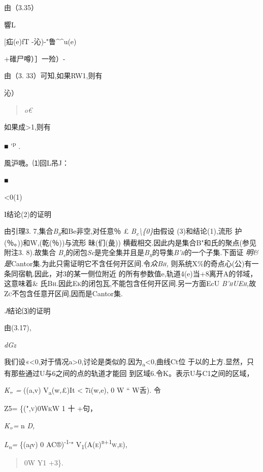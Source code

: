 \documentclass{article}
\begin{document}
由（3.35）

響L

{[}疝(e)fT -沁)-"鲁\^{}\^{}u(e)

+碓尸噂）］一殓）-

由（3. 33）可知,如果RW1,则有

沁）

\begin{quote}
\emph{o€}
\end{quote}

如果成\textgreater{}1,则有

■ '\textsuperscript{p} .

風沪嘰。⑴回L吊J：

■

\textless{}0(1)

I结论(2)的证明

由引理3. 7,集合\emph{\textsc{B\textsubscript{h}}}和Be非空,对任意％ £
\emph{B\textsubscript{c}\textbackslash{}\{0\}}由假设 (3)和结论(1),流形
护(％。))和W,(乾(％))与流形 昧(们(彘))
横截相交.因此内是集合B"和氏的聚点(参见附注3. 8).故集合
\emph{B\textsubscript{c}}的闭包\emph{Sc}是完全集并且是\emph{\textsc{B\textsubscript{h}}}的导集\emph{\textsc{B'h}}的一个子集.下面证
\emph{明\&是}Cantor集.为此只需证明它不含任何开区间.令\emph{众\textsc{Bh,
}}则系统X\%的奇点心(公)有一条同宿軌.因此，对3的某一侧位附近
的所有参数值e,轨道4(e)当+8离开A的邻域，这意味着\&
氏\textsc{Bh.}因此\textsc{Ek}的闭包瓦,不能包含任何开区间.另一方面EcU
\emph{\textsc{B'hUEh,}}故\textsc{Zc}不包含任意开区间,因而是Cantor集.

\emph{J}结论⑶的证明

由(3.17),

\emph{dGz}

我们设«\textless{}0,对于情况a\textgreater{}0,讨论是类似的.因为\textsubscript{a}\textless{}0,曲线Ct位
于以的上方.显然，只有那些通过U与6之间的点的轨道才能回
到区域6.令K。表示U与C1之间的区域，

\emph{K„ =} ((a,v) \textbar{}V\textsubscript{a}(w,£)It \textless{}
7i(w,e), 0 W `` W舌). 令

Z5= \textsc{\{(",v)\textbar{}0WkW} 1 十 +句，

\emph{K„=} n \emph{D,}

\emph{L\textsubscript{n}=} \{(a\textsubscript{f}v) \textbar{}0
AC®)\textsuperscript{-1-}"
\textsc{V\textsubscript{1}(A(e)\textsuperscript{b+1}w,e),}

\begin{quote}
0W Y1 +3\}.
\end{quote}
\end{document}
